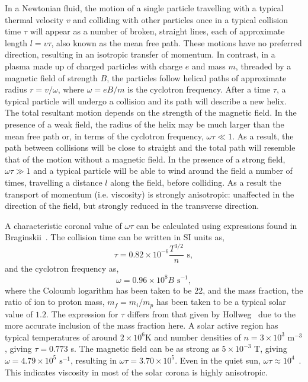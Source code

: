 \label{sec:visc_in_magnetised_plasma}

In a Newtonian fluid, the motion of a single particle travelling with a typical thermal velocity $v$ and colliding with other particles once in a typical collision time $\tau$ will appear as a number of broken, straight lines, each of approximate length $l = v\tau$, also known as the mean free path. These motions have no preferred direction, resulting in an isotropic transfer of momentum. In contrast, in a plasma made up of charged particles with charge $e$ and mass $m$, threaded by a magnetic field of strength $B$, the particles follow helical paths of approximate radius $r = v/\omega$, where $\omega = eB/m$ is the cyclotron frequency. After a time $\tau$, a typical particle will undergo a collision and its path will describe a new helix. The total resultant motion depends on the strength of the magnetic field. In the presence of a weak field, the radius of the helix may be much larger than the mean free path or, in terms of the cyclotron frequency, $\omega \tau \ll 1$. As a result, the path between collisions will be close to straight and the total path will resemble that of the motion without a magnetic field. In the presence of a strong field, $\omega \tau \gg 1$ and a typical particle will be able to wind around the field a number of times, travelling a distance $l$ along the field, before colliding. As a result the transport of momentum (i.e. viscosity) is strongly anisotropic: unaffected in the direction of the field, but strongly reduced in the transverse direction.

A characteristic coronal value of $\omega \tau$ can be calculated using expressions found in Braginskii~\cite{braginskiiTransportProcessesPlasma1965}. The collision time can be written in SI units as,
\begin{equation}
  \label{eq:collision_time}
  \tau = 0.82 \times 10^{-6} \frac{T^{3/2}}{n} \text{ s},
\end{equation}
and the cyclotron frequency as,
\begin{equation}
  \label{eq:cyclotron_frequency}
  \omega = 0.96\times10^8 B \text{ s}^{-1},
\end{equation}
where the Coloumb logarithm has been taken to be 22, and the mass fraction, the ratio of ion to proton mass, $m_f = m_i/m_p$ has been taken to be a typical solar value of $1.2$. The expression for $\tau$ differs from that given by Hollweg~\cite{hollwegViscosityMagnetizedPlasma1985} due to the more accurate inclusion of the mass fraction here. A solar active region has typical temperatures of around $2\times 10^6$K and number densities of $n = 3 \times 10^3\text{ m}^{-3}$, giving $\tau = 0.773$ s. The magnetic field can be as strong as $5\times 10^{-3}$ T, giving $\omega = 4.79 \times 10^5 \text{ s}^{-1}$, resulting in $\omega \tau = 3.70 \times 10^5$. Even in the quiet sun, $\omega\tau \approx 10^4$~\cite{morganGlobalConditionsSolar2017}. This indicates viscosity in most of the solar corona is highly anisotropic. 

